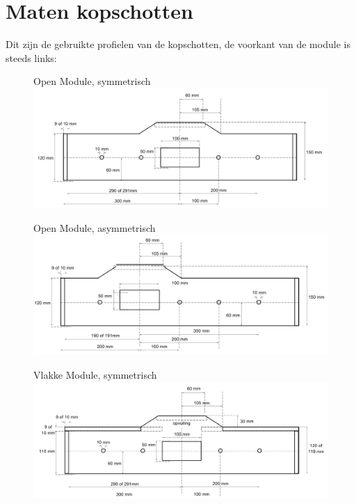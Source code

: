 \documentclass[12pt,a4paper]{report}
\begin{document}
\section{Maten kopschotten}

Dit zijn de gebruikte profielen van de kopschotten, de voorkant van de module is steeds links:

\begin{figure}[!ht]
  \captionbox
  {Open Module, symmetrisch}
  {\includegraphics[scale=0.25]{images/rcu_open_sym}}
\end{figure}

\begin{figure}[!ht]
  \captionbox
  {Open Module, asymmetrisch}
  {\includegraphics[scale=0.25]{images/rcu_open_asym}}
\end{figure}

\begin{figure}[!ht]
  \captionbox
  {Vlakke Module, symmetrisch}
  {\includegraphics[scale=0.25]{images/rcu_vlak_sym}}
\end{figure}
\end{document}
